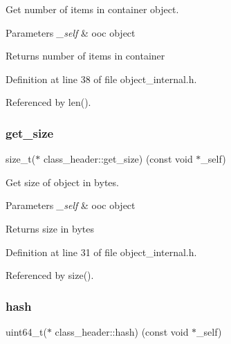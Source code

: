 Get number of items in container object. 


\begin{DoxyParams}{Parameters}
{\em \+\_\+self} & ooc object \\
\hline
\end{DoxyParams}
\begin{DoxyReturn}{Returns}
number of items in container 
\end{DoxyReturn}


Definition at line 38 of file object\+\_\+internal.\+h.



Referenced by len().

\mbox{\label{structclass__header_a5c135b5316d0d9d22dce1f32fb8befb1}} 
\subsubsection{\texorpdfstring{get\+\_\+size}{get\_size}}
{\footnotesize\ttfamily size\+\_\+t($\ast$ class\+\_\+header\+::get\+\_\+size) (const void $\ast$\+\_\+self)}



Get size of object in bytes. 


\begin{DoxyParams}{Parameters}
{\em \+\_\+self} & ooc object \\
\hline
\end{DoxyParams}
\begin{DoxyReturn}{Returns}
size in bytes 
\end{DoxyReturn}


Definition at line 31 of file object\+\_\+internal.\+h.



Referenced by size().

\mbox{\label{structclass__header_aa0035a2c833b1e46f0ae401d6b44ee65}} 
\subsubsection{\texorpdfstring{hash}{hash}}
{\footnotesize\ttfamily uint64\+\_\+t($\ast$ class\+\_\+header\+::hash) (const void $\ast$\+\_\+self)}


